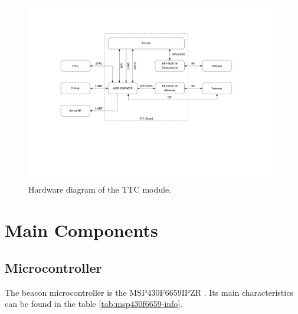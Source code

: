 \documentclass[12pt]{book}
\begin{document}
\begin{figure}[!h]
	\begin{center}
		\includegraphics[width=\textwidth]{figures/hardware_diagram.pdf}
		\caption{Hardware diagram of the TTC module.}
		\label{fig:hardware-diagram}
	\end{center}
\end{figure}

\section{Main Components}

\subsection{Microcontroller}

The beacon microcontroller is the MSP430F6659IPZR \cite{msp430f6659}. Its main characteristics can be found in the table \ref{tab:msp430f6659-info}.

\end{document}
